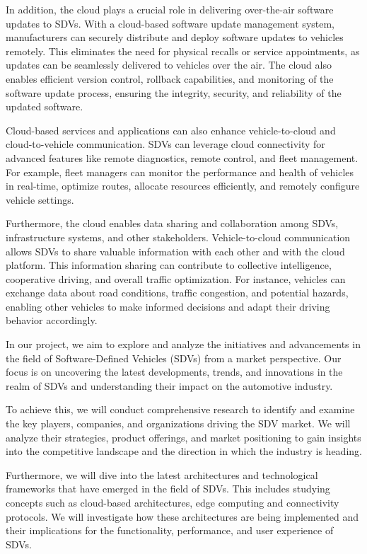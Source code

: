 \documentclass[
12pt,
oneside, 
onehalfspacing, 
nolistspacing, 
parskip, 
chapterinoneline, 
]{AASTCOMPUTER}
\begin{document}
In addition, the cloud plays a crucial role in delivering over-the-air software updates to SDVs. With a cloud-based software update management system, manufacturers can securely distribute and deploy software updates to vehicles remotely. This eliminates the need for physical recalls or service appointments, as updates can be seamlessly delivered to vehicles over the air. The cloud also enables efficient version control, rollback capabilities, and monitoring of the software update process, ensuring the integrity, security, and reliability of the updated software.

Cloud-based services and applications can also enhance vehicle-to-cloud and cloud-to-vehicle communication. SDVs can leverage cloud connectivity for advanced features like remote diagnostics, remote control, and fleet management. For example, fleet managers can monitor the performance and health of vehicles in real-time, optimize routes, allocate resources efficiently, and remotely configure vehicle settings.

Furthermore, the cloud enables data sharing and collaboration among SDVs, infrastructure systems, and other stakeholders. Vehicle-to-cloud communication allows SDVs to share valuable information with each other and with the cloud platform. This information sharing can contribute to collective intelligence, cooperative driving, and overall traffic optimization. For instance, vehicles can exchange data about road conditions, traffic congestion, and potential hazards, enabling other vehicles to make informed decisions and adapt their driving behavior accordingly.

In our project, we aim to explore and analyze the initiatives and advancements in the field of Software-Defined Vehicles (SDVs) from a market perspective. Our focus is on uncovering the latest developments, trends, and innovations in the realm of SDVs and understanding their impact on the automotive industry.

To achieve this, we will conduct comprehensive research to identify and examine the key players, companies, and organizations driving the SDV market. We will analyze their strategies, product offerings, and market positioning to gain insights into the competitive landscape and the direction in which the industry is heading.

Furthermore, we will dive into the latest architectures and technological frameworks that have emerged in the field of SDVs. This includes studying concepts such as cloud-based architectures, edge computing and connectivity protocols. We will investigate how these architectures are being implemented and their implications for the functionality, performance, and user experience of SDVs.
\end{document}
